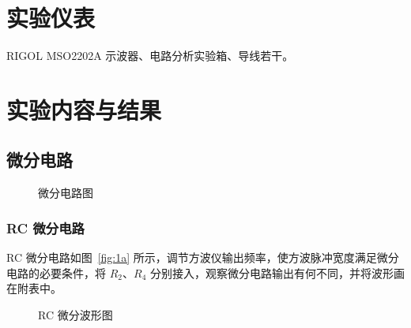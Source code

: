 \documentclass[a4paper,utf8]{article}
\begin{document}
\section{实验仪表}
    RIGOL MSO2202A 示波器、电路分析实验箱、导线若干。
\section{实验内容与结果}
\subsection{微分电路}
    \begin{figure}[!ht]
        \hspace{6mm}
        \caption{微分电路图}
    \end{figure}
    \subsubsection{RC 微分电路}
        RC 微分电路如图~\ref{fig:1a} 所示，调节方波仪输出频率，使方波脉冲宽度满足微分电路的必要条件，将 $R_2$、$R_4$ 分别接入，观察微分电路输出有何不同，并将波形画在附表中。
        \begin{figure}[!ht]
            \hspace{6mm}
            \caption{RC 微分波形图}
        \end{figure}
\end{document}
